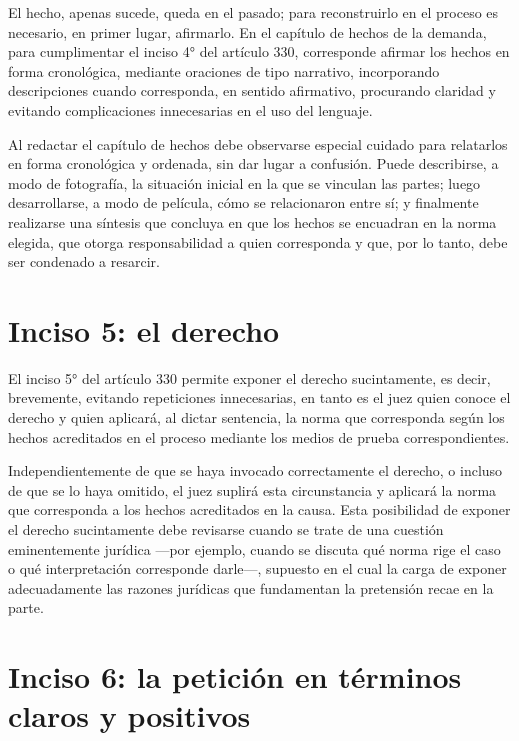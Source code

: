 \documentclass[12pt,oneside]{book}
\begin{document}
El hecho, apenas sucede, queda en el pasado; para reconstruirlo en el proceso es necesario, en primer lugar, afirmarlo. En el capítulo de hechos de la demanda, para cumplimentar el inciso 4° del artículo 330, corresponde afirmar los hechos en forma cronológica, mediante oraciones de tipo narrativo, incorporando descripciones cuando corresponda, en sentido afirmativo, procurando claridad y evitando complicaciones innecesarias en el uso del lenguaje.

\begin{note}
Al redactar el capítulo de hechos debe observarse especial cuidado para relatarlos en forma cronológica y ordenada, sin dar lugar a confusión. Puede describirse, a modo de fotografía, la situación inicial en la que se vinculan las partes; luego desarrollarse, a modo de película, cómo se relacionaron entre sí; y finalmente realizarse una síntesis que concluya en que los hechos se encuadran en la norma elegida, que otorga responsabilidad a quien corresponda y que, por lo tanto, debe ser condenado a resarcir.
\end{note}

\section{Inciso 5: el derecho}

El inciso 5° del artículo 330 permite exponer el derecho sucintamente, es decir, brevemente, evitando repeticiones innecesarias, en tanto es el juez quien conoce el derecho y quien aplicará, al dictar sentencia, la norma que corresponda según los hechos acreditados en el proceso mediante los medios de prueba correspondientes.

\begin{important}
Independientemente de que se haya invocado correctamente el derecho, o incluso de que se lo haya omitido, el juez suplirá esta circunstancia y aplicará la norma que corresponda a los hechos acreditados en la causa. Esta posibilidad de exponer el derecho sucintamente debe revisarse cuando se trate de una cuestión eminentemente jurídica —por ejemplo, cuando se discuta qué norma rige el caso o qué interpretación corresponde darle—, supuesto en el cual la carga de exponer adecuadamente las razones jurídicas que fundamentan la pretensión recae en la parte.
\end{important}

\section{Inciso 6: la petición en términos claros y positivos}
\end{document}

